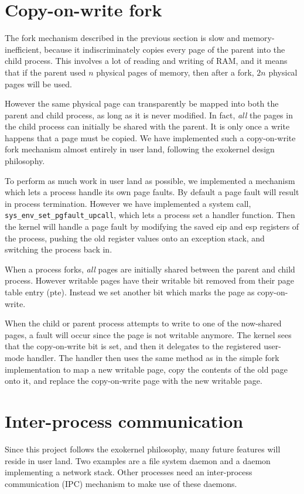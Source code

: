 \documentclass{report}
\begin{document}
\section{Copy-on-write fork}
The fork mechanism described in the previous section is slow and
memory-inefficient, because it indiscriminately copies every page of the
parent into the child process. This involves a lot of reading and writing of
RAM, and it means that if the parent used $n$ physical pages of memory, then
after a fork, $2n$ physical pages will be used.

However the same physical page can transparently be mapped into both the
parent and child process, as long as it is never modified. In fact, \emph{all}
the pages in the child process can initially be shared with the parent. It is
only once a write happens that a page must be copied. We have implemented such
a copy-on-write fork mechanism almost entirely in user land, following the
exokernel design philosophy.

To perform as much work in user land as possible, we implemented a mechanism
which lets a process handle its own page faults. By default a page fault will
result in process termination. However we have implemented a system call,
\texttt{sys\_env\_set\_pgfault\_upcall}, which lets a process set a handler
function. Then the kernel will handle a page fault by modifying the saved
\gls{eip} and \gls{esp} registers of the process, pushing the old register
values onto an exception stack, and switching the process back in.

When a process forks, \emph{all} pages are initially shared between the parent
and child process. However writable pages have their writable bit removed from
their page table entry (\gls{pte}). Instead we set another bit which marks the
page as copy-on-write.

When the child or parent process attempts to write to one of the now-shared
pages, a fault will occur since the page is not writable anymore. The kernel
sees that the copy-on-write bit is set, and then it delegates to the
registered user-mode handler. The handler then uses the same method as in the
simple fork implementation to map a new writable page, copy the contents of
the old page onto it, and replace the copy-on-write page with the new writable
page.


\section{Inter-process communication}
Since this project follows the exokernel philosophy, many future features will
reside in user land. Two examples are a file system daemon and a daemon
implementing a network stack. Other processes need an inter-process
communication (IPC) mechanism to make use of these daemons.
\end{document}
